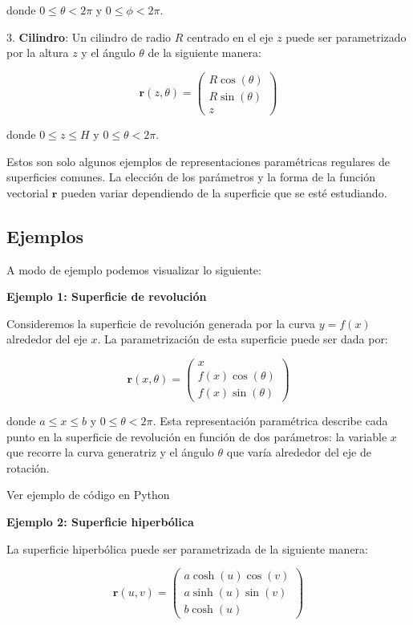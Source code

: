 \documentclass{article}
\begin{document}
		donde $0 \leq \theta < 2\pi$ y $0 \leq \phi < 2\pi$.
		
		3. \textbf{Cilindro}: Un cilindro de radio $R$ centrado en el eje $z$ puede ser parametrizado por la altura $z$ y el ángulo $\theta$ de la siguiente manera:
		
		$$
		\textbf{r}(z, \theta) = \begin{pmatrix} R \cos(\theta) \\ R \sin(\theta) \\ z \end{pmatrix}
		$$
		
		donde $0 \leq z \leq H$ y $0 \leq \theta < 2\pi$.
		
		Estos son solo algunos ejemplos de representaciones paramétricas regulares de superficies comunes. La elección de los parámetros y la forma de la función vectorial $\textbf{r}$ pueden variar dependiendo de la superficie que se esté estudiando.
		
	\subsection{Ejemplos}
	
		A modo de ejemplo podemos visualizar lo siguiente:
		
	
			
			\textbf{Ejemplo 1: Superficie de revolución}
			
			Consideremos la superficie de revolución generada por la curva $y = f(x)$ alrededor del eje $x$. La parametrización de esta superficie puede ser dada por:
			
			$$
			\textbf{r}(x, \theta) = \begin{pmatrix} x \\ f(x) \cos(\theta) \\ f(x) \sin(\theta) \end{pmatrix}
			$$
			
			donde $a \leq x \leq b$ y $0 \leq \theta < 2\pi$. Esta representación paramétrica describe cada punto en la superficie de revolución en función de dos parámetros: la variable $x$ que recorre la curva generatriz y el ángulo $\theta$ que varía alrededor del eje de rotación.
			
			Ver ejemplo de código en Python
			
			\textbf{Ejemplo 2: Superficie hiperbólica}
			
			La superficie hiperbólica puede ser parametrizada de la siguiente manera:
			
			$$
			\textbf{r}(u, v) = \begin{pmatrix} a \cosh(u) \cos(v) \\ a \sinh(u) \sin(v) \\ b \cosh(u) \end{pmatrix}
			$$
			
\end{document}
